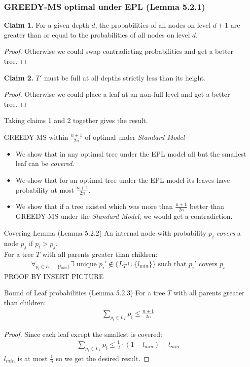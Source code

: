 \documentclass{beamer}
\theoremstyle{plain}
\begin{document}
\begin{frame}\frametitle{GREEDY-MS optimal under EPL (Lemma 5.2.1)}
\textbf{Claim 1.}\label{Claim-EPL}
For a given depth $d$, the probabilities of all nodes on level $d+1$ are greater than or equal to the probabilities of all nodes on level $d$.
\begin{proof}
Otherwise we could swap contradicting probabilities and get a better tree.
\end{proof}

\noindent \textbf{Claim 2.}\label{Claim-EPL2}
$T'$ must be full at all depths strictly less than its height.
\begin{proof}
Otherwise we could place a leaf at an non-full level and get a better tree.
\end{proof}

Taking claims 1 and 2 together gives the result.
\end{frame}

\begin{frame}{GREEDY-MS within $\frac{n+1}{2n}$ of optimal under \textit{Standard Model} }
\begin{itemize}
\item[1.] We show that in any optimal tree under the EPL model all but the smallest leaf can be \textit{covered}.
\item[2.] We show that for an optimal tree under the EPL model its leaves have probability at most $\frac{n+1}{2n}$.
\item[3.] We show that if a tree existed which was more than  $\frac{n+1}{2n}$ better than GREEDY-MS under the \textit{Standard Model}, we would get a contradiction.
\end{itemize}
\end{frame}

\begin{frame}{Covering Lemma (Lemma 5.2.2)}
An internal node with probability $p_i$ \textit{covers} a node $p_j$ if $p_i > p_j$.\\
For a tree $T$ with all parents greater than children:
\begin{align*}
\forall_{p_i \in L_T-\{l_{min}\}} \exists \text{ unique } p_i' \notin \{L_T \cup \{l_{min}\}\} \text{ such that } p_i' \text{ covers } p_i
\end{align*}
PROOF BY INSERT PICTURE

\end{frame}

\begin{frame}{Bound of Leaf probabilities (Lemma 5.2.3)}
For a tree $T$ with all parents greater than children:
\begin{align*}
\sum_{p_i \in L_T} p_i \leq \frac{n+1}{2n}
\end{align*}
\begin{proof}
Since each leaf except the smallest is covered:
\begin{align*}
\sum_{p_i \in L_T} p_i \leq \frac{1}{2} \cdot (1-l_{min}) + l_{min}
\end{align*}
$l_{min}$ is at most $\frac{1}{n}$ so we get the desired result.
\end{proof}
\end{frame}
\end{document}
